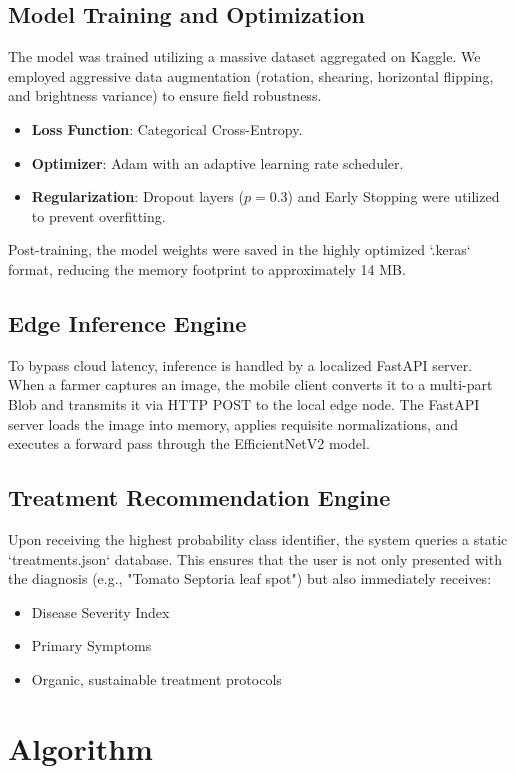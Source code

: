 \documentclass[conference]{IEEEtran}
\begin{document}
\subsection{Model Training and Optimization}
The model was trained utilizing a massive dataset aggregated on Kaggle. We employed aggressive data augmentation (rotation, shearing, horizontal flipping, and brightness variance) to ensure field robustness. 
\begin{itemize}
    \item \textbf{Loss Function}: Categorical Cross-Entropy.
    \item \textbf{Optimizer}: Adam with an adaptive learning rate scheduler.
    \item \textbf{Regularization}: Dropout layers ($p=0.3$) and Early Stopping were utilized to prevent overfitting.
\end{itemize}
Post-training, the model weights were saved in the highly optimized `.keras` format, reducing the memory footprint to approximately 14 MB.

\subsection{Edge Inference Engine}
To bypass cloud latency, inference is handled by a localized FastAPI server. When a farmer captures an image, the mobile client converts it to a multi-part Blob and transmits it via HTTP POST to the local edge node. The FastAPI server loads the image into memory, applies requisite normalizations, and executes a forward pass through the EfficientNetV2 model.

\subsection{Treatment Recommendation Engine}
Upon receiving the highest probability class identifier, the system queries a static `treatments.json` database. This ensures that the user is not only presented with the diagnosis (e.g., "Tomato Septoria leaf spot") but also immediately receives:
\begin{itemize}
    \item Disease Severity Index
    \item Primary Symptoms
    \item Organic, sustainable treatment protocols
\end{itemize}

\section{Algorithm}
\end{document}
